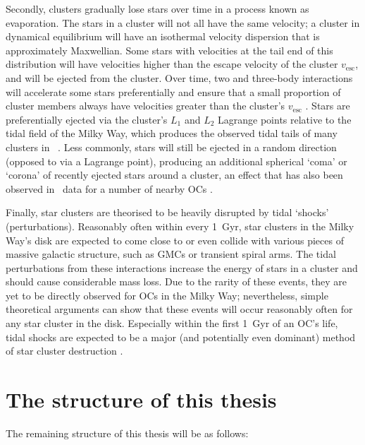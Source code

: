 Secondly, clusters gradually lose stars over time in a process known as evaporation. The stars in a cluster will not all have the same velocity; a cluster in dynamical equilibrium will have an isothermal velocity dispersion that is approximately Maxwellian. Some stars with velocities at the tail end of this distribution will have velocities higher than the escape velocity of the cluster $v_\text{esc}$, and will be ejected from the cluster. Over time, two and three-body interactions will accelerate some stars preferentially and ensure that a small proportion of cluster members always have velocities greater than the cluster's $v_\text{esc}$ \citep{portegies_zwart_young_2010,krause_physics_2020}. Stars are preferentially ejected via the cluster's $L_1$ and $L_2$ Lagrange points relative to the tidal field of the Milky Way, which produces the observed tidal tails of many clusters in \gaia\ \citep{portegies_zwart_young_2010,tarricq_structural_2022}. Less commonly, stars will still be ejected in a random direction (opposed to via a Lagrange point), producing an additional spherical `coma' or `corona' of recently ejected stars around a cluster, an effect that has also been observed in \gaia\ data for a number of nearby OCs \citep{meingast_extended_2021,tarricq_structural_2022}.

Finally, star clusters are theorised to be heavily disrupted by tidal `shocks' (perturbations). Reasonably often within every 1~Gyr, star clusters in the Milky Way's disk are expected to come close to or even collide with various pieces of massive galactic structure, such as GMCs or transient spiral arms. The tidal perturbations from these interactions increase the energy of stars in a cluster and should cause considerable mass loss. Due to the rarity of these events, they are yet to be directly observed for OCs in the Milky Way; nevertheless, simple theoretical arguments can show that these events will occur reasonably often for any star cluster in the disk. Especially within the first 1~Gyr of an OC's life, tidal shocks are expected to be a major (and potentially even dominant) method of star cluster destruction \citep{krause_physics_2020}.


\section{The structure of this thesis}
\label{sec:intro:structure}

The remaining structure of this thesis will be as follows:


